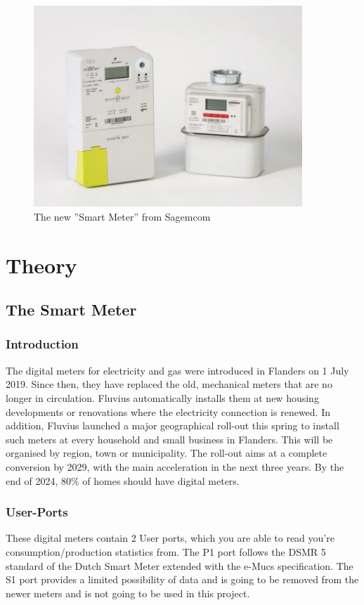 \documentclass[a4paper,twoside, 12pt]{report}
\theoremstyle{break}
\begin{document}
\begin{figure}[H]
  \centering
  \includegraphics[width=0.9\textwidth]{SmartMeter.jpg}
  \caption{The new ''Smart Meter'' from Sagemcom}
\end{figure}

\eject


\chapter{Theory}


\section{The Smart Meter}

\subsection{Introduction}

The digital meters for electricity and gas were introduced in Flanders on 1 July 2019. Since then, they have replaced the old, mechanical meters that are no longer in circulation. Fluvius automatically installs them at new housing developments or renovations where the electricity connection is renewed. In addition, Fluvius launched a major geographical roll-out this spring to install such meters at every household and small business in Flanders. This will be organised by region, town or municipality. The roll-out aims at a complete conversion by 2029, with the main acceleration in the next three years. By the end of 2024, 80\% of homes should have digital meters.

\subsection{User-Ports}
These digital meters contain 2 User ports, which you are able to read you're consumption/production statistics from. The P1 port follows the DSMR 5 standard of the Dutch Smart Meter extended with the e-Mucs specification.
The S1 port provides a limited possibility of data and is going to be removed from the newer meters and is not going to be used in this project.
\end{document}
